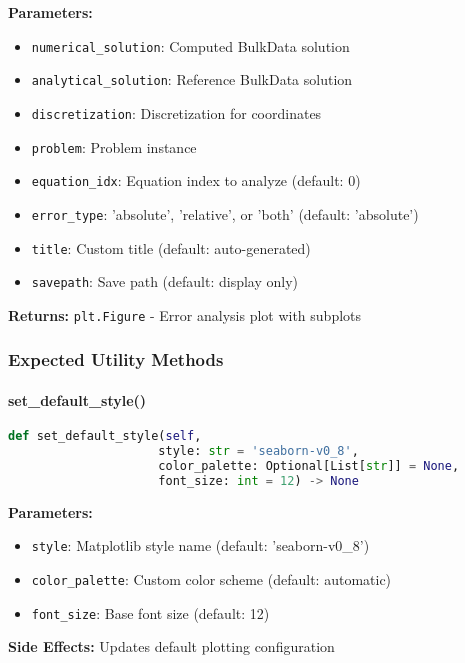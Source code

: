 \textbf{Parameters:}
\begin{itemize}
    \item \texttt{numerical\_solution}: Computed BulkData solution
    \item \texttt{analytical\_solution}: Reference BulkData solution
    \item \texttt{discretization}: Discretization for coordinates
    \item \texttt{problem}: Problem instance
    \item \texttt{equation\_idx}: Equation index to analyze (default: 0)
    \item \texttt{error\_type}: 'absolute', 'relative', or 'both' (default: 'absolute')
    \item \texttt{title}: Custom title (default: auto-generated)
    \item \texttt{savepath}: Save path (default: display only)
\end{itemize}

\textbf{Returns:} \texttt{plt.Figure} - Error analysis plot with subplots

\subsubsection{Expected Utility Methods}

\paragraph{set\_default\_style()}\leavevmode
\begin{lstlisting}[language=Python, caption=Expected Style Configuration Method]
def set_default_style(self,
                     style: str = 'seaborn-v0_8',
                     color_palette: Optional[List[str]] = None,
                     font_size: int = 12) -> None
\end{lstlisting}

\textbf{Parameters:}
\begin{itemize}
    \item \texttt{style}: Matplotlib style name (default: 'seaborn-v0\_8')
    \item \texttt{color\_palette}: Custom color scheme (default: automatic)
    \item \texttt{font\_size}: Base font size (default: 12)
\end{itemize}

\textbf{Side Effects:} Updates default plotting configuration

